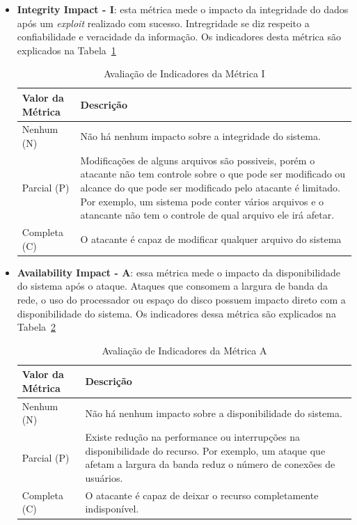 \begin{itemize}
\begin{table}[H]
\begin{center}
	\end{center}
	\end{table}
\item \textbf{Integrity Impact - I}: esta métrica mede o impacto da integridade do dados após um \emph{exploit} realizado com sucesso. Intregridade se diz respeito a confiabilidade e veracidade da informação. Os indicadores desta métrica são explicados na Tabela~\ref{tab:i_scoring}
	\begin{table}[H]
	\begin{center}
	    \begin{tabular}{ | l | p{10cm} |}
	    \hline
	    Valor da Métrica & Descrição \\ \hline
	    Nenhum (N) & Não há nenhum impacto sobre a integridade do sistema. \\ \hline
	    Parcial (P) & Modificações de alguns arquivos são possiveis, porém o atacante não tem controle sobre o que pode ser modificado ou alcance do que pode ser modificado pelo atacante é limitado. Por exemplo, um sistema pode conter vários arquivos e o atancante não tem o controle de qual arquivo ele irá afetar.  \\ \hline
	    Completa (C) & O atacante é capaz de modificar qualquer arquivo do sistema\\ \hline
	    \end{tabular}
	    \caption{Avaliação de Indicadores da Métrica I}
	    \label{tab:i_scoring}
	\end{center}
	\end{table}
\item \textbf{Availability Impact - A}: essa métrica mede o impacto da disponibilidade do sistema após o ataque. Ataques que consomem a largura de banda da rede, o uso do processador ou espaço do disco possuem impacto direto com a disponibilidade do sistema. Os indicadores dessa métrica são explicados na Tabela~\ref{tab:a_scoring}
	\begin{table}[H]
	\begin{center}
	    \begin{tabular}{ | l | p{10cm} |}
	    \hline
	    Valor da Métrica & Descrição \\ \hline
	    Nenhum (N) & Não há nenhum impacto sobre a disponibilidade do sistema. \\ \hline
	    Parcial (P) & Existe redução na performance ou interrupções na disponibilidade do recurso. Por exemplo, um ataque que afetam a largura da banda reduz o número de conexões de usuários.\\ \hline
	    Completa (C) & O atacante é capaz de deixar o recurso completamente indisponível.\\ \hline
	    \end{tabular}
	    \caption{Avaliação de Indicadores da Métrica A}
	    \label{tab:a_scoring}
	\end{center}
	\end{table}
\end{itemize}

